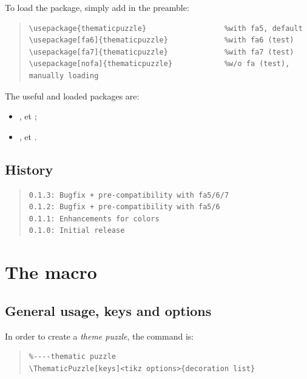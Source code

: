 \documentclass[11pt,a4paper]{ltxdoc}
\begin{document}
To load the package, simply add in the preamble:

\begin{quote}
\begin{verbatim}
\usepackage{thematicpuzzle}                  %with fa5, default
\usepackage[fa6]{thematicpuzzle}             %with fa6 (test)
\usepackage[fa7]{thematicpuzzle}             %with fa7 (test)
\usepackage[nofa]{thematicpuzzle}            %w/o fa (test), manually loading
\end{verbatim}
\end{quote}

The useful and loaded packages are:

\begin{itemize}
	\item {},  et ;
	\item {},  et .
\end{itemize}

\vfill

\subsection{History}

\begin{quote}
\begin{verbatim}
0.1.3: Bugfix + pre-compatibility with fa5/6/7
0.1.2: Bugfix + pre-compatibility with fa5/6
0.1.1: Enhancements for colors
0.1.0: Initial release
\end{verbatim}
\end{quote}

\pagebreak

\section{The macro}

\subsection{General usage, keys and options}

In order to create a \textit{theme puzzle}, the command is:

\begin{quote}
\begin{verbatim}
%----thematic puzzle
\ThematicPuzzle[keys]<tikz options>{decoration list}
\end{verbatim}
\end{quote}
\end{document}
